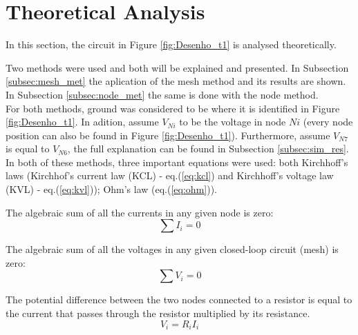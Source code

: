 
\section{Theoretical Analysis}
\label{sec:analysis}



In this section, the circuit in Figure \ref{fig:Desenho_t1} is analysed theoretically.

Two methods were used and both will be explained and presented. In Subsection \ref{subsec:mesh_met}
the aplication of the mesh method and its results are shown. In Subsection \ref{subsec:node_met} the
same is done with the node method. \\


For both methods, ground was considered to be where it is identified in Figure \ref{fig:Desenho_t1}.
In adition, assume $V_{Ni}$ to be the voltage in node $Ni$ (every node position can also be found in
Figure \ref{fig:Desenho_t1}). Furthermore, assume $V_{N7}$ is equal to $V_{N6}$, the full explanation
can be found in Subsection \ref{subsec:sim_res}. \\

In both of these methods, three important equations were used: both Kirchhoff's laws (Kirchhof's
current law (KCL) - eq.(\ref{eq:kcl}) and Kirchhoff's voltage law (KVL) - eq.(\ref{eq:kvl}));
Ohm's law (eq.(\ref{eq:ohm})).

The algebraic sum of all the currents in any given node is zero:
\begin{equation}
	\sum I_i = 0
	\label{eq:kcl}
\end{equation}

The algebraic sum of all the voltages in any given closed-loop circuit (mesh) is zero:
\begin{equation}
	\sum V_i = 0
	\label{eq:kvl}
\end{equation}

The potential difference between the two nodes connected to a resistor is equal to the current that 
passes through the resistor multiplied by its resistance.
\begin{equation}
	V_i = R_iI_i
	\label{eq:ohm}
\end{equation}




